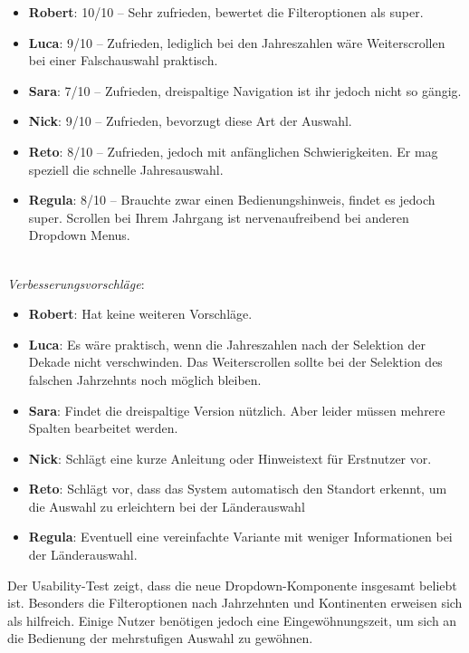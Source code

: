 \begin{itemize}
    \item \textbf{Robert}: 
          {\color{editorGreen} 10/10} – Sehr zufrieden, bewertet die Filteroptionen als super.
    \item \textbf{Luca}: 
          {\color{editorGreen} 9/10} – Zufrieden, lediglich bei den Jahreszahlen wäre Weiterscrollen bei einer Falschauswahl praktisch. 
    \item \textbf{Sara}: 
          {\color{editorGreen} 7/10} – Zufrieden, dreispaltige Navigation ist ihr jedoch nicht so gängig. 
    \item \textbf{Nick}: 
          {\color{editorGreen} 9/10} – Zufrieden, bevorzugt diese Art der Auswahl. 
    \item \textbf{Reto}: 
          {\color{editorGreen} 8/10} – Zufrieden, jedoch mit anfänglichen Schwierigkeiten. 
          Er mag speziell die schnelle Jahresauswahl.
\item \textbf{Regula}:
{\color{editorGreen} 8/10} –  Brauchte zwar einen Bedienungshinweis, findet es jedoch super. Scrollen bei Ihrem Jahrgang ist nervenaufreibend bei anderen Dropdown Menus.
\end{itemize}

 \\
\emph{Verbesserungsvorschläge}: 

\begin{itemize}
    \item \textbf{Robert}: 
          Hat keine weiteren Vorschläge.
    \item \textbf{Luca}: 
          Es wäre praktisch, wenn die Jahreszahlen nach der Selektion der Dekade nicht verschwinden. 
          Das Weiterscrollen sollte bei der Selektion des falschen Jahrzehnts noch möglich bleiben. 
    \item \textbf{Sara}:
          Findet die dreispaltige Version nützlich. 
          Aber leider müssen mehrere Spalten bearbeitet werden. 
    \item \textbf{Nick}: 
          Schlägt eine kurze Anleitung oder Hinweistext für Erstnutzer vor. 
    \item \textbf{Reto}:
Schlägt vor, dass das System automatisch den Standort erkennt, um die Auswahl zu erleichtern bei der Länderauswahl
\item \textbf{Regula}:
Eventuell eine vereinfachte Variante mit weniger Informationen bei der Länderauswahl.
\end{itemize}

Der Usability-Test zeigt, dass die neue Dropdown-Komponente insgesamt beliebt ist. 
Besonders die Filteroptionen nach Jahrzehnten und Kontinenten erweisen sich als hilfreich. 
Einige Nutzer benötigen jedoch eine Eingewöhnungszeit, um sich an die Bedienung der mehrstufigen Auswahl zu gewöhnen.

